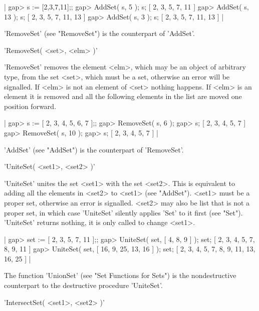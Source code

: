 |    gap> s := [2,3,7,11];;
    gap> AddSet( s, 5 );  s;
    [ 2, 3, 5, 7, 11 ]
    gap> AddSet( s, 13 );  s;
    [ 2, 3, 5, 7, 11, 13 ]
    gap> AddSet( s, 3 );  s;
    [ 2, 3, 5, 7, 11, 13 ] |

'RemoveSet' (see "RemoveSet") is the counterpart of 'AddSet'.

%

'RemoveSet( <set>, <elm> )'

'RemoveSet' removes   the  element  <elm>,  which  may be   an  object of
arbitrary  type, from the set <set>,  which must be  a  set, otherwise an
error will be signalled.  If  <elm>  is  not an  element of <set> nothing
happens.  If <elm>  is  an element it is removed   and  all the following
elements in the list are moved one position forward.

|    gap> s := [ 2, 3, 4, 5, 6, 7 ];;
    gap> RemoveSet( s, 6 );
    gap> s;
    [ 2, 3, 4, 5, 7 ]
    gap> RemoveSet( s, 10 );
    gap> s;
    [ 2, 3, 4, 5, 7 ] |

'AddSet' (see "AddSet") is the counterpart of 'RemoveSet'.

%

'UniteSet( <set1>, <set2> )'

'UniteSet' unites the set <set1> with the set <set2>.  This is equivalent
to adding all the elements  in <set2>  to <set1> (see "AddSet").   <set1>
must be a proper set, otherwise an  error is  signalled.  <set2> may also
be  list that  is  not a  proper set,  in  which case 'UniteSet' silently
applies 'Set' to it first (see "Set").  'UniteSet' returns nothing, it is
only called to change <set1>.

|    gap> set := [ 2, 3, 5, 7, 11 ];;
    gap> UniteSet( set, [ 4, 8, 9 ] );  set;
    [ 2, 3, 4, 5, 7, 8, 9, 11 ]
    gap> UniteSet( set, [ 16, 9, 25, 13, 16 ] );  set;
    [ 2, 3, 4, 5, 7, 8, 9, 11, 13, 16, 25 ] |

The  function  'UnionSet'   (see  "Set  Functions   for  Sets")  is   the
nondestructive counterpart to the destructive procedure 'UniteSet'.

%

'IntersectSet( <set1>, <set2> )'

